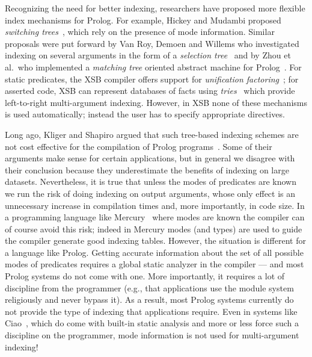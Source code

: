 \documentclass{llncs}
\begin{document}
Recognizing the need for better indexing, researchers have proposed
more flexible index mechanisms for Prolog. For example, Hickey and
Mudambi proposed \emph{switching trees}~\cite{HickeyMudambi@JLP-89},
which rely on the presence of mode information. Similar proposals were
put forward by Van Roy, Demoen and Willems who investigated indexing
on several arguments in the form of a \emph{selection tree}~\cite{VRDW87}
and by Zhou et al.\ who implemented a \emph{matching tree} oriented
abstract machine for Prolog~\cite{TOAM@ICLP-90}. For static
predicates, the XSB compiler offers support for \emph{unification
factoring}~\cite{UnifFact@POPL-95}; for asserted code, XSB can
represent databases of facts using \emph{tries}~\cite{Tries@JLP-99}
which provide left-to-right multi-argument indexing. However, in XSB
none of these mechanisms is used automatically; instead the user has
to specify appropriate directives.

Long ago, Kliger and Shapiro argued that such tree-based indexing
schemes are not cost effective for the compilation of Prolog
programs~\cite{KligerShapiro@ICLP-88}. Some of their arguments make
sense for certain applications, but in general we disagree with their
conclusion because they underestimate the benefits of indexing on
large datasets. Nevertheless, it is true that unless the modes of
predicates are known we run the risk of doing indexing on output
arguments, whose only effect is an unnecessary increase in compilation
times and, more importantly, in code size. In a programming language
like Mercury~\cite{Mercury@JLP-96} where modes are known the compiler
can of course avoid this risk; indeed in Mercury modes (and types) are
used to guide the compiler generate good indexing tables. However, the
situation is different for a language like Prolog. Getting accurate
information about the set of all possible modes of predicates requires
a global static analyzer in the compiler --- and most Prolog systems
do not come with one. More importantly, it requires a lot of
discipline from the programmer (e.g., that applications use the module
system religiously and never bypass it). As a result, most Prolog
systems currently do not provide the type of indexing that
applications require. Even in systems like Ciao~\cite{Ciao@SCP-05},
which do come with built-in static analysis and more or less force
such a discipline on the programmer, mode information is not used for
multi-argument indexing!
\end{document}
